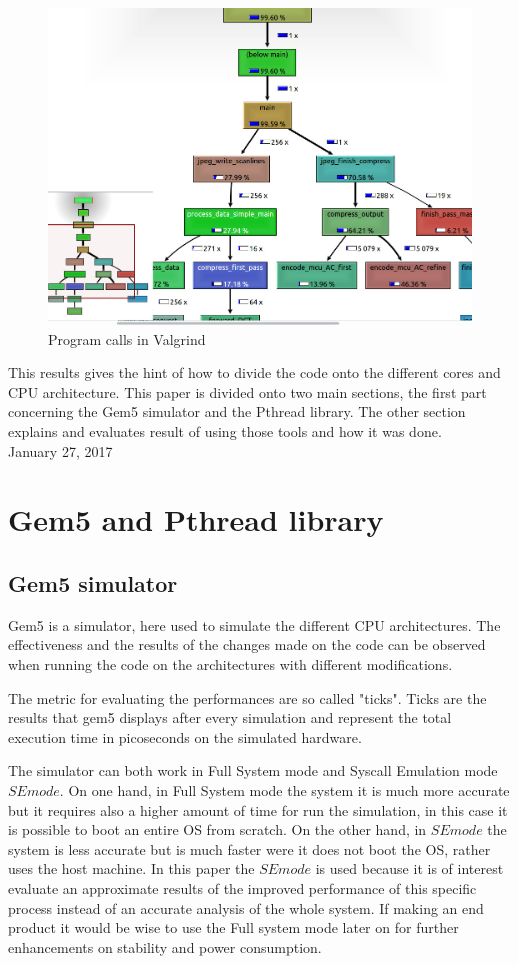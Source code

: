 \documentclass[journal]{IEEEtran}
\begin{document}
\begin{figure}[!h]
	\includegraphics[width=\linewidth]{valgrind}
	\caption{Program calls in Valgrind}
	\label{fig:valgrind}
\end{figure} 

This results gives the hint of how to divide the code onto the different cores and CPU architecture. This paper is divided onto two main sections, the first part concerning the Gem5 simulator and the Pthread library. The other section explains and evaluates result of using those tools and how it was done.\\

 
\hfill January 27, 2017


\section{Gem5 and Pthread library}
\subsection{Gem5 simulator}
Gem5 is a simulator, here used to simulate the different CPU architectures. The effectiveness and the results of the changes made on the code can be observed when running the code on the architectures with different modifications. 

The metric for evaluating the performances are so called "ticks". Ticks are the results that gem5 displays after every simulation and represent the total execution time in picoseconds on the simulated hardware.
 
The simulator can both work in Full System mode and Syscall Emulation mode \(SE mode\). On one hand, in Full System mode the system it is much more accurate but it requires also a higher amount of time for run the simulation, in this case it is possible to boot an entire OS from scratch. On the other hand, in \(SE mode\) the system is less accurate but is much faster were it does not boot the OS, rather uses the host machine.
In this paper the \(SE mode\) is used because it is of interest evaluate an approximate results of the improved performance of this specific process instead of an accurate analysis of the whole system. If making an end product it would be wise to use the Full system mode later on for further enhancements on stability and power consumption.
\end{document}
